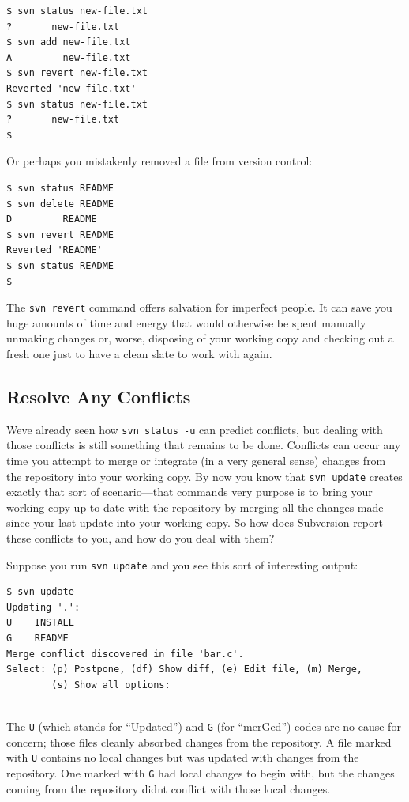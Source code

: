 \begin{verbatim}
$ svn status new-file.txt
?       new-file.txt
$ svn add new-file.txt
A         new-file.txt
$ svn revert new-file.txt
Reverted 'new-file.txt'
$ svn status new-file.txt
?       new-file.txt
$
\end{verbatim}

Or perhaps you mistakenly removed a file from version control:

\begin{verbatim}
$ svn status README
$ svn delete README
D         README
$ svn revert README
Reverted 'README'
$ svn status README
$
\end{verbatim}

The \texttt{svn\ revert} command offers salvation for imperfect people.
It can save you huge amounts of time and energy that would otherwise be
spent manually unmaking changes or, worse, disposing of your working
copy and checking out a fresh one just to have a clean slate to work
with again.

\subsection{Resolve Any Conflicts}\label{svn.tour.cycle.resolve}

We\textquotesingle ve already seen how \texttt{svn\ status\ -u} can
predict conflicts, but dealing with those conflicts is still something
that remains to be done. Conflicts can occur any time you attempt to
merge or integrate (in a very general sense) changes from the repository
into your working copy. By now you know that \texttt{svn\ update}
creates exactly that sort of scenario---that command\textquotesingle s
very purpose is to bring your working copy up to date with the
repository by merging all the changes made since your last update into
your working copy. So how does Subversion report these conflicts to you,
and how do you deal with them?

Suppose you run \texttt{svn\ update} and you see this sort of
interesting output:

\begin{verbatim}
$ svn update
Updating '.':
U    INSTALL
G    README
Merge conflict discovered in file 'bar.c'.
Select: (p) Postpone, (df) Show diff, (e) Edit file, (m) Merge,
        (s) Show all options:
        
\end{verbatim}

The \texttt{U} (which stands for ``Updated'') and \texttt{G} (for
``merGed'') codes are no cause for concern; those files cleanly absorbed
changes from the repository. A file marked with \texttt{U} contains no
local changes but was updated with changes from the repository. One
marked with \texttt{G} had local changes to begin with, but the changes
coming from the repository didn\textquotesingle t conflict with those
local changes.

